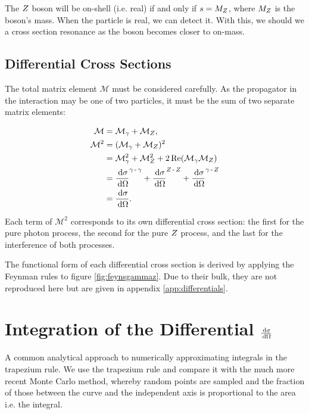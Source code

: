 \documentclass[]{article}
\begin{document}
The $Z $ boson will be on-shell (i.e. real) if and only if $s = M_{Z }$, where $M_{Z }$ is the boson's mass. When the particle is real, we can detect it. With this, we should we a cross section resonance as the boson becomes closer to on-mass.

\subsection{Differential Cross Sections}

The total matrix element $\mathcal{M}$ must be considered carefully. As the propagator in the interaction may be one of two particles, it must be the sum of two separate matrix elements:

\begin{align*}
\mathcal{M} &= \mathcal{M}_{\gamma} + \mathcal{M}_{\Zzero},
\\
\mathcal{M}^{2} &= (\mathcal{M}_{\gamma} + \mathcal{M}_{\Zzero})^{2}
\\
&= \mathcal{M}_{\gamma}^{2} + \mathcal{M}_{\Zzero}^{2} + 2\operatorname{Re}(\mathcal{M}_{\gamma}\mathcal{M}_{\Zzero})
\\
&= \frac{\d{\sigma}}{\d{\Omega}}^{\gamma\operatorname{-}\gamma} +
	\frac{\d{\sigma}}{\d{\Omega}}^{\Zzero\operatorname{-}\Zzero} +
	\frac{\d{\sigma}}{\d{\Omega}}^{\gamma\operatorname{-}\Zzero}
\\
&= \frac{\d{\sigma}}{\d{\Omega}}.
\end{align*}

Each term of $\mathcal{M}^{2}$ corresponds to its own differential cross section: the first for the pure photon process, the second for the pure $Z $ process, and the last for the interference of both processes.

The functional form of each differential cross section is derived by applying the Feynman rules to figure \ref{fig:feynsgammaz}. Due to their bulk, they are not reproduced here but are given in appendix \ref{app:differentials}.


\section{Integration of the Differential $\frac{\,\operatorname{d}\!{\sigma}}{\,\operatorname{d}\!{\Omega}}$}\label{sec:integration}

A common analytical approach to numerically approximating integrals in the trapezium rule. We use the trapezium rule and compare it with the much more recent Monte Carlo method, whereby random points are sampled and the fraction of those between the curve and the independent axis is proportional to the area i.e. the integral.
\end{document}

